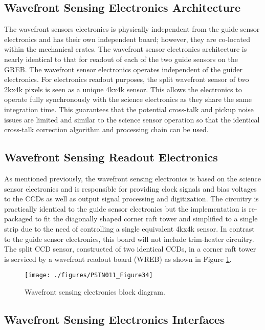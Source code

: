 \subsection{Wavefront Sensing Electronics Architecture}

The wavefront sensors electronics is physically independent from the guide sensor electronics and has
their own independent board; however, they are co-located within the mechanical crates. The
wavefront sensor electronics architecture is nearly identical to that for readout of each of the two guide
sensors on the GREB. The wavefront sensor electronics operates independent of the guider electronics.
For electronics readout purposes, the split wavefront sensor of two 2kx4k pixels is seen as a unique
4kx4k sensor. This allows the electronics to operate fully synchronously with the science electronics as
they share the same integration time. This guarantees that the potential cross-talk and pickup noise
issues are limited and similar to the science sensor operation so that the identical cross-talk correction
algorithm and processing chain can be used.

\subsection{Wavefront Sensing Readout Electronics}

As mentioned previously, the wavefront sensing electronics is based on the science sensor electronics
and is responsible for providing clock signals and bias voltages to the CCDs as well as output signal
processing and digitization. The circuitry is practically identical to the guide sensor electronics but the
implementation is re-packaged to fit the diagonally shaped corner raft tower and simplified to a single
strip due to the need of controlling a single equivalent 4kx4k sensor. In contrast to the guide sensor
electronics, this board will not include trim-heater circuitry.
The split CCD sensor, constructed of two identical CCDs, in a corner raft tower is serviced by a wavefront
readout board (WREB) as shown in Figure \ref{fig:Fig34}.

\begin{figure}[htbp]
\begin{center}
\texttt{[image: ./figures/PSTN011\_Figure34]}
\caption{Wavefront sensing electronics block diagram.}
\label{fig:Fig34}
\end{center}
\end{figure}

\subsection{Wavefront Sensing Electronics Interfaces}

